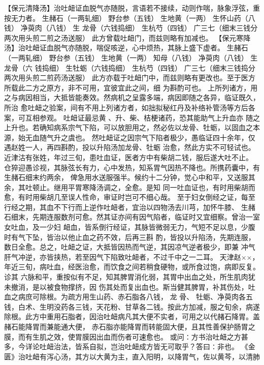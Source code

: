 \documentclass[a4paper,12pt,UTF8,twoside]{ctexbook}
\begin{document}
【保元清降汤】治吐衄证血脱气亦随脱，言语若不接续，动则作喘，脉象浮弦，重按无力者。 
生赭石（一两轧细） 野台参（五钱） 生地黄（一两） 生怀山药（八钱） 净萸肉（八钱） 生 
龙骨（六钱捣细） 生杭芍（四钱） 广三七（细末三钱分两次用头煎二煎之汤送服） 
此方曾载吐衄门，而兹则略有加减也。 
【保元寒降汤】治吐衄证血脱气亦随脱，喘促咳逆，心中烦热，其脉上盛下虚者。 
生赭石（一两轧细） 野台参（五钱） 生地黄（一两） 知母（八钱） 净萸肉（八钱） 生龙骨（六 
钱捣细） 生牡蛎（六钱捣细） 生杭芍（四钱） 广三七（细末三钱捣分两次用头煎二煎药汤送服） 
此方亦载于吐衄门中，而兹则略有更改也。至于医方所载此二方之原方，非不可用，宜彼宜此之间，细 
为斟酌可也。 
上所列诸方，用之与病因相当，大抵皆能奏效。然病机之呈露多端，病因即随之各异，临证既久，所治 
愈吐衄之验案，间有不用上列诸方者，如拙拟秘红丹及补络补管汤等方后各案，可互相参观。 
吐衄证最忌黄 、升、柴、桔梗诸药，恐其能助气上升血亦 
随之上升也。若确知病系宗气下陷，可以放胆用之，然必佐以龙骨、牡蛎，以固血之本源，始无血随气升之虞也。 
然吐衄证之因宗气下陷者极少，愚临证四十余年，仅遇赵姓一人，再四斟酌，投以升陷汤加龙骨、牡蛎 
治愈，然此方实不可轻试也。近津沽有张姓，年过三旬，患吐血证，医者方中有柴胡二钱，服后遂大吐不止。 
仓猝迎愚诊视，其脉弦长有力，心中发热，知系胃气因热不降也。所携药囊中，有生赭石细末约两余， 
俾急用水送服强半。候约十二分钟，觉心中和平，又送服其余，其吐顿止。继用平胃寒降汤调之，全愈。是知 
同一吐血证也，有时用柴胡而愈，有时用柴胡几至误人性命，审证时岂可不细心哉。 
至于妇女倒经之证，每至行经之期，其血不下行而上逆作吐衄者，宜治以四物汤去川芎，加怀牛膝、 
生赭石细末，先期连服数剂可愈。然其证亦间有因气陷者，临证时又宜细察。曾治一室女吐血，及一少妇 
衄血，皆系倒行经证，其脉皆微弱无力，气短不足以息，少腹时有气下坠，皆治以他止血之药不效，后再三斟 
酌，皆投以升陷汤，先期连服，数日全愈。总之，吐衄之证，大抵皆因热而气逆，其因凉气逆者极少，即兼 
冲气肝气冲逆，亦皆挟热，若至因气下陷致吐衄者，不过千中之一二耳。 
天津赵××，年近三旬，病吐血，经医治愈，而饮食之间若稍食硬物，或所食过饱，病即反复。诊其 
六脉和平，重按似有不足，知其脾胃消化弱，其胃中出血之处，所生肌肉犹未撤消，是以被食物撑挤，因 
伤其处而复出血也。斯当健其脾胃，补其伤处，吐血之病庶可除根。为疏方用生山药、赤石脂各八钱， 龙 
骨、 牡蛎、净萸肉各五钱，白术、生明没药各三钱，天花粉、甘草各二钱。按此方加减，服之旬余，病遂 
除根。此方中重用石脂者，因治吐衄病凡其大便不实者，可用之以代赭石降胃。盖赭石能降胃而兼能通大便， 
赤石脂亦能降胃而转能固大便，且其性善保护肠胃之膜，而有生肌之效，使胃膜因出血而伤者可速愈也。 
或问∶方书治吐衄之方甚多，今详论吐衄治法，皆系自拟，岂治吐衄成方皆无可取乎？答曰∶非也。 
《金匮》治吐衄有泻心汤，其方以大黄为主，直入阳明，以降胃气，佐以黄芩，以清肺 
\end{document}
